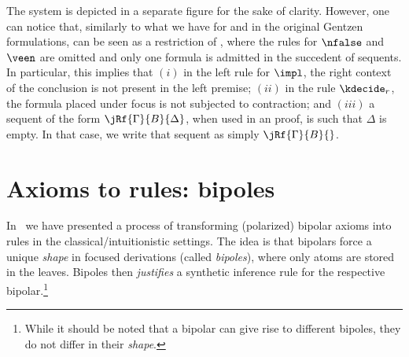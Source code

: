 \documentclass{llncs}
\begin{document}
The system  \LJF is depicted in a separate figure for the sake of clarity.
%
However, one can notice that, similarly to what we have for \LJ and
\LK in the original Gentzen formulations, \LJF can be seen as a
restriction of \LKF, where the rules for $\nfalse$ and $\veen$ are
omitted and only one formula is admitted in the succedent of sequents.  In
particular, this implies that $(i)$ in the left rule for $\impl$, the
right context of the conclusion is not present in the left premise;
$(ii)$ in the rule $\kdecide_r$, the formula placed under focus is
not subjected to contraction; and $(iii)$ a sequent of the form $\jRf{\Gamma}{B}{\Delta}$, when used in an
\LJF proof, is such that $\Delta$ is empty.
%
In that case, we write that sequent as simply $\jRf{\Gamma}{B}{}$.



\section{Axioms to rules: bipoles}
In~\cite{DBLP:journals/apal/MarinMPV22} we have presented a process of transforming (polarized) bipolar axioms into rules in the
classical/intuitionistic settings. 
The idea is that bipolars force a unique {\em shape} in focused derivations (called {\em bipoles}), where only atoms are stored in the leaves.
Bipoles then {\em justifies} a synthetic inference rule for the respective bipolar.\footnote{While it should be noted that a bipolar can give rise to different bipoles, they do not differ in their {\em shape}.}
\end{document}

